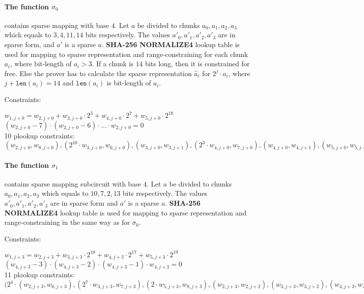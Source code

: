 \paragraph{The function $\sigma_0$} contains sparse mapping with base $4$.
Let $a$ be divided to chunks $a_0, a_1, a_2, a_3$ which equals to $3, 4, 11, 14$ bits respectively.
The values $a'_0, a'_1, a'_2, a'_3$ are in sparse form, and $a'$ is a sparse $a$.
\textbf{SHA-256 NORMALIZE4} lookup table is used for mapping to sparse representation and range-constraining for each chunk $a_i$, where bit-length of $a_i > 3$.
If a chunk is $14$ bits long, then it is constrained for free.
Else the prover has to calculate the sparse representation $\hat{a}_i$ for $2^j \cdot a_i$, where $j + \texttt{len}(a_i) = 14$ and $\texttt{len}(a_i)$ is bit-length of $a_i$.

Constraints:
\begin{center}
    $w_{1, j + 0} = w_{2, j + 0} + w_{3,j + 0} \cdot 2^3 + w_{4,j + 0} \cdot 2^{7} + w_{5, j + 0} \cdot 2^{18}$ \\
    $(w_{2, j + 0} - 7) \cdot (w_{2, j + 0} - 6) \cdot ... \cdot w_{2, j + 0} = 0$ \\
    10 plookup constraints: $(w_{2, j + 0}, w_{8, j + 0}), ( 2^{10} \cdot w_{3, j + 0}, w_{6, j + 0}), (w_{3, j + 0}, w_{3, j + 1}), (2^3 \cdot w_{4, j + 0}, w_{7, j + 0}), (w_{4, j + 0}, w_{4, j + 1}), (w_{5, j + 0}, w_{5, j + 1}), (w_{6, j + 1}, (w_{4, j + 1} + w_{5,j + 1} + w_{3,j + 1}), (w_{7, j + 1}, (w_{5,j + 1} + w_{8,j + 0} + w_{4, j + 1}, (w_{8, j + 1}, (w_{8,j + 0} + w_{3,j + 1} + w_{5,j + 1}), (w_{9,j + 1}, (w_{3,j + 1} + w_{4, j + 1})$ \\
\end{center}

\paragraph{The function $\sigma_1$} contains sparse mapping subcircuit with base $4$.
Let $a$ be divided to chunks $a_0, a_1, a_2, a_3$ which equals to $10, 7, 2, 13$ bits respectively.
The values $a'_0, a'_1, a'_2, a'_3$ are in sparse form and $a'$ is a sparse $a$.
\textbf{SHA-256 NORMALIZE4} lookup table is used for mapping to sparse representation and range-constraining in the same way as for $\sigma_0$.

Constraints:
\begin{center}
    $w_{1, j + 3} = w_{2, j + 3} + w_{3, j + 3} \cdot 2^{10} + w_{4,j + 3} \cdot 2^{17} + w_{5, j + 3} \cdot 2^{19}$ \\
    $(w_{4,j + 3} - 3) \cdot (w_{4,j + 3} - 2) \cdot (w_{4,j + 3} - 1) \cdot w_{4,j + 3} = 0$ \\
    11 plookup constraints: $(2^4 \cdot (w_{2, j + 3}, w_{6, j + 3}), (2^7 \cdot w_{3, j + 3}, w_{7,j+3}), (2 \cdot w_{5, j+3}, w_{8, j + 3}), (w_{2,j + 3}, w_{2,j+2}), (w_{3, j + 3}, w_{3, j + 2}), (w_{4,j + 3}, w_{4,j+2}), (w_{5, j + 3}, w_{5, j+2}), (w_{6, j + 2}, (w_{4, j + 2} + w_{5,j + 2} + w_{3,j + 2})), (w_{7, j + 2}, (w_{5,j + 2} + w_{2,j + 2} + w_{4,j + 2}, (w_{8,j + 2}, (w_{2,j + 2} + w_{3,j + 2} + w_{5,j + 2}), (w_{9,j + 2}, (w_{3,j + 2} + w_{4,j + 2})$ \\
\end{center}

